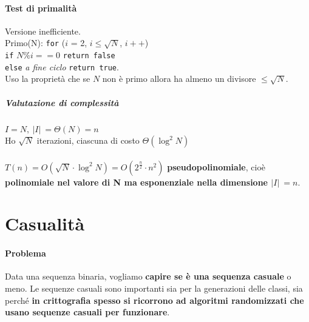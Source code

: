 \documentclass[10pt]{book}
\begin{document}
\paragraph{Test di primalità} Versione inefficiente.\\
Primo(N): \texttt{for} ($i$ = 2, $i\leq \sqrt{N}$, $i++$)\\
\texttt{if} $N\% i == 0$ \texttt{return false}\\
\texttt{else} \textit{a fine ciclo} \texttt{return true}.\\
Uso la proprietà che se $N$ non è primo allora ha almeno un divisore $\leq \sqrt{N}$.
\subparagraph{Valutazione di complessità} $I = N, \:|I|\: = \Theta(N) = n$\\
Ho $\sqrt{N}$ iterazioni, ciascuna di costo $\Theta(\log^2 N)$\\\\
$T(n) = O(\sqrt{N} \cdot \log^2 N) = O(2^{\frac{n}{2}}\cdot n^2)$ \textbf{pseudopolinomiale}, cioè \textbf{polinomiale nel valore di N ma esponenziale nella dimensione $|I|\: = n$}.
\pagebreak
\section{Casualità}
\paragraph{Problema} Data una sequenza binaria, vogliamo \textbf{capire se è una sequenza casuale} o meno. Le sequenze casuali sono importanti sia per la generazioni delle classi, sia perché \textbf{in crittografia spesso si ricorrono ad algoritmi randomizzati che usano sequenze casuali per funzionare}.
\end{document}
